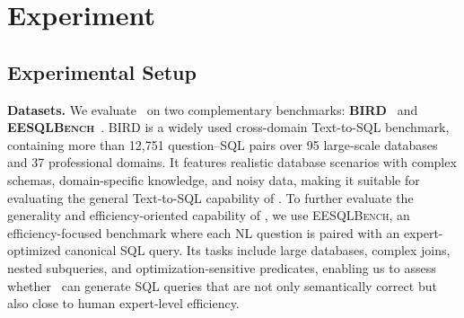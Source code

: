 \section{Experiment}
\label{sec:evaluation}

\begingroup
\setlength{\abovedisplayskip}{3pt}
\setlength{\belowdisplayskip}{3pt}
\setlength{\abovedisplayshortskip}{2pt}
\setlength{\belowdisplayshortskip}{2pt}
\setlength{\jot}{2pt}




%





\subsection{Experimental Setup}
\textbf{Datasets.}
We evaluate \toolname\ on two complementary benchmarks: \textbf{\textsc{BIRD}}~\cite{li2023can} and \textbf{\textsc{EESQLBench}}~\cite{lin2026cracking}.
\textsc{BIRD} is a widely used cross-domain Text-to-SQL benchmark, containing more than 12,751 question--SQL pairs over 95 large-scale databases and 37 professional domains.
It features realistic database scenarios with complex schemas, domain-specific knowledge, and noisy data, making it suitable for evaluating the general Text-to-SQL capability of \toolname.
%
To further evaluate the generality and efficiency-oriented capability of \toolname, we use \textsc{EESQLBench}, an efficiency-focused benchmark where each NL question is paired with an expert-optimized canonical SQL query.
Its tasks include large databases, complex joins, nested subqueries, and optimization-sensitive predicates, enabling us to assess whether \toolname\ can generate SQL queries that are not only semantically correct but also close to human expert-level efficiency.

